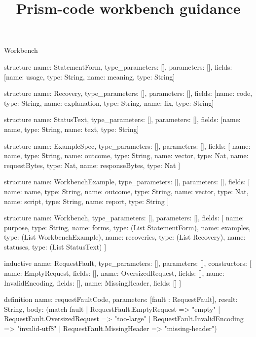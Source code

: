 \begin{lexlean}{Workbench}
\title{Prism-code workbench guidance}
\begin{semanticmodule}
structure{
  name: StatementForm,
  type_parameters: [],
  parameters: [],
  fields: [{name: usage, type: String}, {name: meaning, type: String}]
}

structure{
  name: Recovery,
  type_parameters: [],
  parameters: [],
  fields: [{name: code, type: String}, {name: explanation, type: String}, {name: fix, type: String}]
}

structure{
  name: StatusText,
  type_parameters: [],
  parameters: [],
  fields: [{name: name, type: String}, {name: text, type: String}]
}

structure{
  name: ExampleSpec,
  type_parameters: [],
  parameters: [],
  fields: [
    {name: name, type: String},
    {name: outcome, type: String},
    {name: vector, type: Nat},
    {name: requestBytes, type: Nat},
    {name: responseBytes, type: Nat}
  ]
}

structure{
  name: WorkbenchExample,
  type_parameters: [],
  parameters: [],
  fields: [
    {name: name, type: String},
    {name: outcome, type: String},
    {name: vector, type: Nat},
    {name: script, type: String},
    {name: report, type: String}
  ]
}

structure{
  name: Workbench,
  type_parameters: [],
  parameters: [],
  fields: [
    {name: purpose, type: String},
    {name: forms, type: (List StatementForm)},
    {name: examples, type: (List WorkbenchExample)},
    {name: recoveries, type: (List Recovery)},
    {name: statuses, type: (List StatusText)}
  ]
}

inductive{
  name: RequestFault,
  type_parameters: [],
  parameters: [],
  constructors: [
    {name: EmptyRequest, fields: []},
    {name: OversizedRequest, fields: []},
    {name: InvalidEncoding, fields: []},
    {name: MissingHeader, fields: []}
  ]
}

definition{
  name: requestFaultCode,
  parameters: [fault : RequestFault],
  result: String,
  body: (match fault
    | RequestFault.EmptyRequest => "empty"
    | RequestFault.OversizedRequest => "too-large"
    | RequestFault.InvalidEncoding => "invalid-utf8"
    | RequestFault.MissingHeader => "missing-header")
}


\end{semanticmodule}
\end{lexlean}
